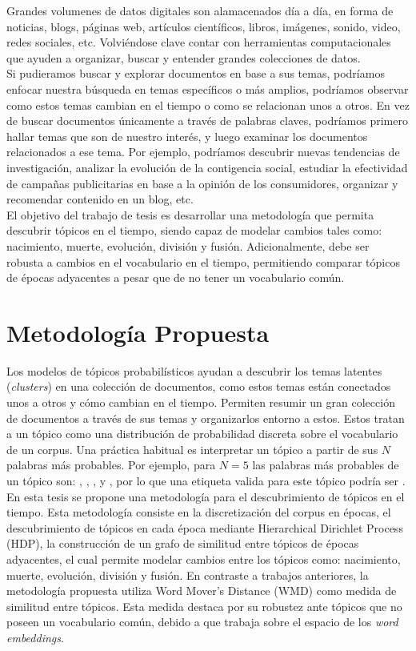 Grandes volumenes de datos digitales son alamacenados día a día, en forma de noticias, blogs, páginas web, artículos científicos, libros, imágenes, sonido, video, redes sociales, etc. Volviéndose clave contar con herramientas computacionales que ayuden a organizar, buscar y entender grandes colecciones de datos. \\

Si pudieramos buscar y explorar documentos en base a sus temas, podríamos enfocar nuestra búsqueda en temas específicos o más amplios, podríamos observar como estos temas cambian en el tiempo o como se relacionan unos a otros. En vez de buscar documentos únicamente a través de palabras claves, podríamos primero hallar temas que son de nuestro interés, y luego examinar los documentos relacionados a ese tema. Por ejemplo, podríamos descubrir nuevas tendencias de investigación, analizar la evolución de la contigencia social, estudiar la efectividad de campañas publicitarias en base a la opinión de los consumidores, organizar y recomendar contenido en un blog, etc.\\

El objetivo del trabajo de tesis es desarrollar una metodología que permita descubrir tópicos en el tiempo, siendo capaz de modelar cambios tales como: nacimiento, muerte, evolución, división y fusión. Adicionalmente, debe ser robusta a cambios en el vocabulario en el tiempo, permitiendo comparar tópicos de épocas adyacentes a pesar que de no tener un vocabulario común.

\section{Metodología Propuesta}
Los modelos de tópicos probabilísticos ayudan a descubrir los temas latentes (\textit{clusters}) en una colección de documentos, como estos temas están conectados unos a otros y cómo cambian en el tiempo. Permiten resumir un gran colección de documentos a través de sus temas y organizarlos entorno a estos. Estos tratan a un tópico como una distribución de probabilidad discreta sobre el vocabulario de un corpus. Una práctica habitual es interpretar un tópico a partir de sus $N$ palabras más probables. Por ejemplo, para $N=5$ las palabras más probables de un tópico son: , , ,  y , por lo que una etiqueta valida para este tópico podría ser .\\ 

En esta tesis se propone una metodología para el descubrimiento de tópicos en el tiempo. Esta metodología consiste en la discretización del corpus en épocas, el descubrimiento de tópicos en cada época mediante Hierarchical Dirichlet Process (HDP), la construcción de un grafo de similitud entre tópicos de épocas adyacentes, el cual permite modelar cambios entre los tópicos como: nacimiento, muerte, evolución, división y fusión. En contraste a trabajos anteriores, la metodología propuesta utiliza Word Mover's Distance (WMD) como medida de similitud entre tópicos. Esta medida destaca por su robustez ante tópicos que no poseen un vocabulario común, debido a que trabaja sobre el espacio de los \textit{word embeddings}.\\

